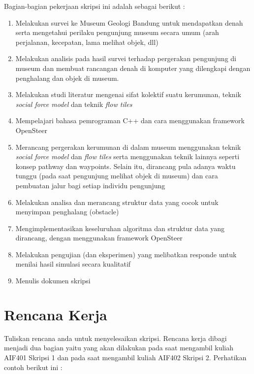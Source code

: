 \documentclass[a4paper,twoside]{article}
\begin{document}
Bagian-bagian pekerjaan skripsi ini adalah sebagai berikut :
	\begin{enumerate}
		\item Melakukan survei ke Museum Geologi Bandung untuk mendapatkan denah serta mengetahui perilaku pengunjung museum secara umum (arah perjalanan, kecepatan, lama melihat objek, dll)
		\item Melakukan analisis pada hasil survei terhadap pergerakan pengunjung di museum dan membuat rancangan denah di komputer yang dilengkapi dengan penghalang dan objek di museum.
		\item Melakukan studi literatur mengenai sifat kolektif suatu kerumunan, teknik {\it social force model} dan teknik {\it flow tiles}
		\item Mempelajari bahasa pemrograman C++ dan cara menggunakan framework OpenSteer
		\item Merancang pergerakan kerumunan di dalam museum menggunakan teknik {\it social force model} dan {\it flow tiles} serta menggunakan teknik lainnya seperti konsep pathway dan waypoints. Selain itu, dirancang pula adanya waktu tunggu (pada saat pengunjung melihat objek di museum) dan cara pembuatan jalur bagi setiap individu pengunjung
		\item Melakukan analisa dan merancang struktur data yang cocok untuk menyimpan penghalang (obstacle)
		\item Mengimplementasikan keseluruhan algoritma dan struktur data yang dirancang, dengan menggunakan framework OpenSteer 
		\item Melakukan pengujian (dan eksperimen) yang melibatkan responde untuk menilai hasil simulasi secara kualitatif
		\item Menulis dokumen skripsi
	\end{enumerate}

\section{Rencana Kerja}
Tuliskan rencana anda untuk menyelesaikan skripsi. Rencana kerja dibagi menjadi dua bagian yaitu yang akan dilakukan pada saat mengambil kuliah AIF401 Skripsi 1 dan pada saat mengambil kuliah AIF402 Skripsi 2. Perhatikan contoh berikut ini :
\end{document}
